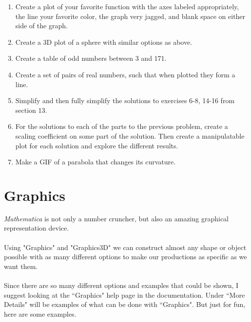 \documentclass[11pt,a4paper,twoside]{article}
\begin{document}
			\begin{enumerate}
			
				\item %
				
					Create a plot of your favorite function with the axes labeled appropriately, the line your favorite color, the graph very jagged, and blank space on either side of the graph.
					
				\item %
				
					Create a 3D plot of a sphere with similar options as above.
					
				\item %
				
					Create a table of odd numbers between 3 and 171.
					
				\item %
				
					Create a set of pairs of real numbers, such that when plotted they form a line.
					
				\item %
				
					Simplify and then fully simplify the solutions to exercises 6-8, 14-16 from section 13.
					
				\item %
				
					For the solutions to each of the parts to the previous problem, create a scaling coefficient on some part of the solution.  Then create a manipulatable plot for each solution and explore the different results.
					
				\item %
				
					Make a GIF of a parabola that changes its curvature.
			
			\end{enumerate}
			
\newpage
			
	\part{Graphics}
	
		\textit{Mathematica} is not only a number cruncher, but also an amazing graphical representation device.
		\\
		\\
		Using "Graphics" and "Graphics3D" we can construct almost any shape or object possible with as many different options to make our productions as specific as we want them.
		\\
		\\
		Since there are so many different options and examples that could be shown, I suggest looking at the ``Graphics" help page in the documentation.  Under ``More Details" will be examples of what can be done with ``Graphics". But just for fun, here are some examples.
		
\end{document}
